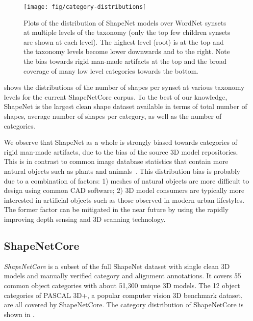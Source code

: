 \begin{figure*}[t]
	\texttt{[image: fig/category-distributions]}
	\caption{Plots of the distribution of ShapeNet models over WordNet synsets at multiple levels of the taxonomy (only the top few children synsets are shown at each level). The highest level (root) is at the top and the taxonomy levels become lower downwards and to the right.  Note the bias towards rigid man-made artifacts at the top and the broad coverage of many low level categories towards the bottom.}
	\label{fig:category-distributions}
\end{figure*}

  shows the distributions of the number of shapes per synset at various taxonomy levels for the current ShapeNetCore corpus. To the best of our knowledge, ShapeNet is the largest clean shape dataset available in terms of total number of shapes, average number of shapes per category, as well as the number of categories.

We observe that ShapeNet as a whole is strongly biased towards categories of rigid man-made artifacts, due to the bias of the source 3D model repositories.  This is in contrast to common image database statistics that contain more natural objects such as plants and animals~\cite{torralba:2010:labelme}. This distribution bias is probably due to a combination of factors: 1) meshes of natural objects are more difficult to design using common CAD software; 2) 3D model consumers are typically more interested in artificial objects such as those observed in modern urban lifestyles. The former factor can be mitigated in the near future by using the rapidly improving depth sensing and 3D scanning technology.

\subsection{ShapeNetCore}

\emph{ShapeNetCore} is a subset of the full ShapeNet dataset with single clean 3D models and manually verified category and alignment annotations. It covers 55 common object categories with about 51,300 unique 3D models. The 12 object categories of PASCAL 3D+\cite{xiang:2014:pascal3d}, a popular computer vision 3D benchmark dataset, are all covered by ShapeNetCore.  The category distribution of ShapeNetCore is shown in .

